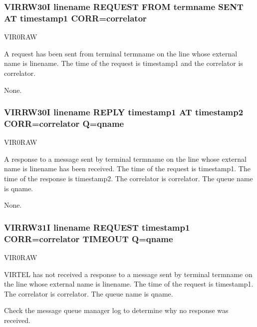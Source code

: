 \documentclass[letterpaper,10pt,english]{sphinxmanual}
\begin{document}
\subsubsection{VIRRW30I linename REQUEST FROM termname SENT AT timestamp1 CORR=correlator}
\label{\detokenize{messages:virrw30i-linename-request-from-termname-sent-at-timestamp1-corr-correlator}}\begin{description}
\sphinxAtStartPar
VIR0RAW

\sphinxAtStartPar
A request has been sent from terminal termname on the line whose external name is linename. The time of the request is timestamp1 and the correlator is correlator.

\sphinxAtStartPar
None.

\end{description}


\subsubsection{VIRRW30I linename REPLY timestamp1 AT timestamp2 CORR=correlator Q=qname}
\label{\detokenize{messages:virrw30i-linename-reply-timestamp1-at-timestamp2-corr-correlator-q-qname}}\begin{description}
\sphinxAtStartPar
VIR0RAW

\sphinxAtStartPar
A response to a message sent by terminal termname on the line whose external name is linename has been received. The time of the request is timestamp1. The time of the response is timestamp2. The correlator is correlator. The queue name is qname.

\sphinxAtStartPar
None.

\end{description}


\subsubsection{VIRRW31I linename REQUEST timestamp1 CORR=correlator TIMEOUT Q=qname}
\label{\detokenize{messages:virrw31i-linename-request-timestamp1-corr-correlator-timeout-q-qname}}\begin{description}
\sphinxAtStartPar
VIR0RAW

\sphinxAtStartPar
VIRTEL has not received a response to a message sent by terminal termname on the line whose external name is linename. The time of the request is timestamp1. The correlator is correlator. The queue name is qname.

\sphinxAtStartPar
Check the message queue manager log to determine why no response was received.

\end{description}
\end{document}
